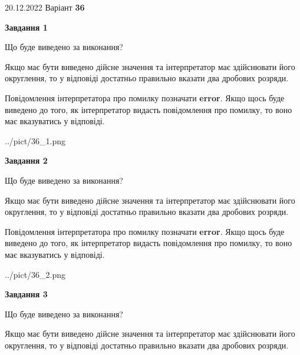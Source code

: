 \documentclass[12pt, ukrainian]{article}
\begin{document}
{20.12.2022 Варіант \No \textbf { 36 }\par}
{
\begin {Large}

{\begin {center}\textbf{Завдання 1}\end {center}}\par
Що буде виведено за виконання? \par

Якщо має бути виведено дійсне значення та інтерпретатор має здійснювати його округлення, 
то у відповіді достатньо правильно вказати два дробових розряди.

Повідомлення інтерпретатора про помилку позначати \textbf{error}.
Якщо щось буде виведено до того, як інтерпретатор видасть повідомлення про помилку, 
то воно має вказуватись у відповіді. \par

\begin{center}
	{../pict/36_1.png}
\end{center}
\newpage

{\begin {center}\textbf{Завдання 2}\end {center}}\par
Що буде виведено за виконання? \par

Якщо має бути виведено дійсне значення та інтерпретатор має здійснювати його округлення, 
то у відповіді достатньо правильно вказати два дробових розряди.

Повідомлення інтерпретатора про помилку позначати \textbf{error}.
Якщо щось буде виведено до того, як інтерпретатор видасть повідомлення про помилку, 
то воно має вказуватись у відповіді. \par

\begin{center}
	{../pict/36_2.png}
\end{center}
\newpage

{\begin {center}\textbf{Завдання 3}\end {center}}\par
Що буде виведено за виконання? \par

Якщо має бути виведено дійсне значення та інтерпретатор має здійснювати його округлення, 
то у відповіді достатньо правильно вказати два дробових розряди.


\end{Large}}
\end{document}
